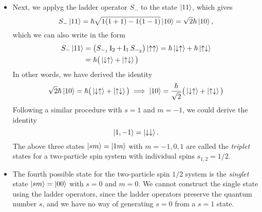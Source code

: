 \documentclass[11pt, a4paper]{article}
\newcommand{\ua}{\uparrow}  %
\newcommand{\da}{\downarrow}  %
\newcommand{\II}{\operatorname{I}}  %
\begin{document}
\begin{itemize}
    \item Next, we applyg the ladder operator $ S_{-} $ to the state $ \ket{11} $, which gives
    \begin{equation*}
        S_{-}\ket{11} = \hbar \sqrt{1(1+1) - 1(1-1)} \ket{10} = \sqrt{2}\hbar \ket{10},
    \end{equation*}
    which we can also write in the form
    \begin{align*}
        S_{-}\ket{11} & = \big( S_{-_{1}}\II_{2} + \II_{1} S_{-_{2}} \big)\ket{\ua\ua} = \hbar \ket{\da\ua} + \hbar \ket{\ua\da}\\
        &= \hbar \big( \ket{\da\ua} + \ket{\ua\da} \big)
    \end{align*}
    In other words, we have derived the identity
    \begin{equation*}
        \sqrt{2}\hbar \ket{10} = \hbar \big( \ket{\da\ua} + \ket{\ua\da} \big) \implies \ket{10} = \frac{\hbar}{\sqrt{2}} \big( \ket{\da\ua} + \ket{\ua\da} \big)
    \end{equation*}
    Following a similar procedure with $ s = 1 $ and $ m = -1 $, we could derive the identity
    \begin{equation*}
        \ket{1, -1} = \ket{\da\da}.
    \end{equation*}
    The above three states $ \ket{sm} = \ket{1m} $ with $ m = -1, 0, 1 $ are called the \textit{triplet} states for a two-particle spin system with individual spins $ s_{1,2} = 1/2 $.

    \item The fourth possible state for the two-particle spin $ 1/2 $ system is the \textit{singlet} state $ \ket{sm} = \ket{00} $ with $ s = 0 $ and $ m = 0 $. We cannot construct the single state using the ladder operators, since the ladder operators preserve the quantum number $ s $, and we have no way of generating $ s = 0 $ from a $ s = 1 $ state. 


\end{itemize}
\end{document}
